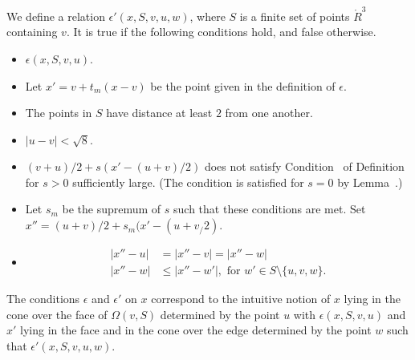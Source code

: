 \begin{tarskidata}
\begin{tarski}
\begin{definition}[$\epsilon'$]
We define a relation $\epsilon'(x,S,v,u,w)$, where $S$ is
a finite set of points  $\ring{R}^3$
containing $v$.  It is true if
the following conditions hold, and false otherwise.
\begin{itemize}
  \item $\epsilon(x,S,v,u)$.
  \item Let $x' = v + t_m(x-v)$ be the point given in the
   definition of $\epsilon$.
  \item The points in $S$ have distance at least $2$ from
one another.
  \item  $|u-v|<\sqrt8$.
  \item  $(v+u)/2 + s (x'- (u+v)/2)$ 
  does not satisfy Condition~
of Definition~
for $s>0$ sufficiently large.   (The condition is satisfied for
$s=0$ by Lemma~.)  
  \item Let $s_m$ be the supremum of $s$ such that these
conditions are met.  Set $x''=(u+v)/2+s_m(x'-(u+v_/2)$.
  \item $$
  \begin{array}{lll}
   |x''-u| &= |x''-v| = |x''-w|\\
   |x''-w| &\le |x''-w'|,\text{ for } w'\in S\setminus\{u,v,w\}.
   \end{array}
  $$
\end{itemize}
\end{definition}
The conditions $\epsilon$ and $\epsilon'$ on $x$ 
correspond to the intuitive notion of $x$ lying
in the cone over the face of $\Omega(v,S)$ determined by the point $u$
with  
$\epsilon(x,S,v,u)$ and $x'$ lying in
the face and in the cone over the edge determined by the point $w$ such
that 
$\epsilon'(x,S,v,u,w)$.
\end{tarski}



\begin{tarski}


\end{tarski}
\end{tarskidata}
